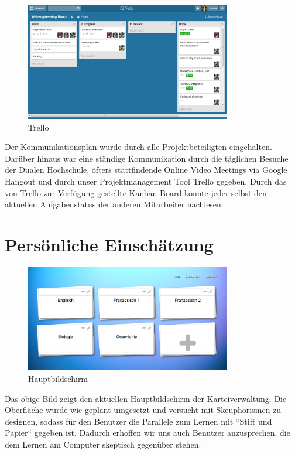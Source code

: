 \documentclass{article}
\begin{document}
\begin{figure}[H]
    \centering
    \includegraphics[width=0.8\textwidth]{images/trello.png}
    \caption{Trello}
    \label{fig:trello}
\end{figure}

Der Kommunikationsplan wurde durch alle Projektbeteiligten eingehalten. Darüber hinaus war eine ständige Kommunikation durch die täglichen Besuche der Dualen Hochschule, öfters stattfindende Online Video Meetings via Google Hangout und durch unser Projektmanagement Tool Trello gegeben. Durch das von Trello zur Verfügung gestellte Kanban Board konnte jeder selbst den aktuellen Aufgabenstatus der anderen Mitarbeiter nachlesen. 

\section{Persönliche Einschätzung}

\begin{figure}[H]
    \centering
    \includegraphics[width=0.8\textwidth]{images/overview.png}
    \caption{Hauptbildschirm}
    \label{fig:dashboard}
\end{figure}

Das obige Bild zeigt den aktuellen Hauptbildschirm der Karteiverwaltung. Die Oberfläche wurde wie geplant umgesetzt und versucht mit Skeuphorismen zu designen, sodass für den Benutzer die Parallele zum Lernen mit ``Stift und Papier`` gegeben ist. Dadurch erhoffen wir uns auch Benutzer anzusprechen, die dem Lernen am Computer skeptisch gegenüber stehen.
\end{document}
